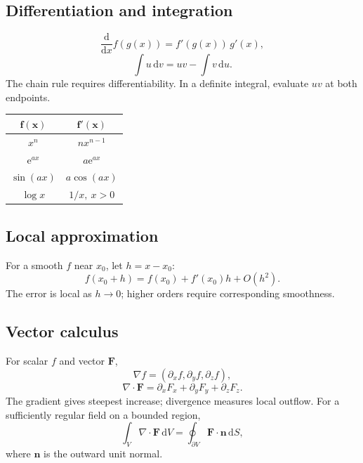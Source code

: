 \begin{referencecolumns}
\begin{referenceentry}
\section{Differentiation and integration}
\[
\frac{\mathrm d}{\mathrm dx}f(g(x))=f'(g(x))\,g'(x),
\]
\[
\int u\,\mathrm dv=uv-\int v\,\mathrm du.
\]
The chain rule requires differentiability. In a definite integral, evaluate
$uv$ at both endpoints.
\begin{referencetable}
\centering
\setlength{\arrayrulewidth}{0.4pt}
\setlength{\tabcolsep}{4pt}
\renewcommand{\arraystretch}{1.05}
\begin{otherlanguage}{english}
\begin{tabular}{|c|c|}
\hline
\rowcolor{black!10}
$\boldsymbol{f(x)}$ & $\boldsymbol{f'(x)}$\\\hline
$x^n$ & $nx^{n-1}$\\\hline
$\mathrm e^{ax}$ & $a\mathrm e^{ax}$\\\hline
$\sin(ax)$ & $a\cos(ax)$\\\hline
$\log x$ & $1/x,\ x>0$\\\hline
\end{tabular}
\end{otherlanguage}
\end{referencetable}
\subsection{Local approximation}
For a smooth $f$ near $x_0$, let $h=x-x_0$:
\[
f(x_0+h)=f(x_0)+f'(x_0)h+O(h^2).
\]
The error is local as $h\to0$; higher orders require corresponding smoothness.
\end{referenceentry}

\begin{referenceentry}
\section{Vector calculus}
For scalar $f$ and vector $\mathbf F$,
\[
\nabla f=(\partial_x f,\partial_y f,\partial_z f),
\]
\[
\nabla\cdot\mathbf F=\partial_x F_x+\partial_y F_y+\partial_z F_z.
\]
The gradient gives steepest increase; divergence measures local outflow.
For a sufficiently regular field on a bounded region,
\[
\int_V\nabla\cdot\mathbf F\,\mathrm dV
=\oint_{\partial V}\mathbf F\cdot\mathbf n\,\mathrm dS,
\]
where $\mathbf n$ is the outward unit normal.
\end{referenceentry}


\end{referencecolumns}
